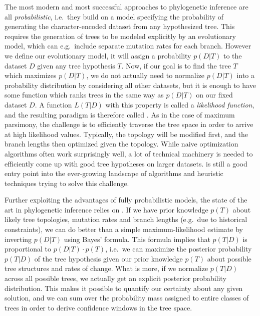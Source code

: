The most modern and most successful approaches to phylogenetic inference are all \textit{probabilistic}, i.e.\ they build on a model specifying the probability of generating the character-encoded dataset from any hypothesized tree. This requires the generation of trees to be modeled explicitly by an evolutionary model, which can e.g.\ include separate mutation rates for each branch. However we define our evolutionary model, it will assign a probability $p(D|T)$ to the dataset $D$ given any tree hypothesis $T$. Now, if our goal is to find the tree $T$ which maximizes $p(D|T)$, we do not actually need to normalize $p(D|T)$ into a probability distribution by considering all other datasets, but it is enough to have some function which ranks trees in the same way as $p(D|T)$ on our fixed dataset $D$. A function $L(T|D)$ with this property is called a \textit{likelihood function}, and the resulting paradigm is therefore called \textit{}. As in the case of maximum parsimony, the challenge is 
to efficiently traverse the tree space in order to arrive at high likelihood values. Typically, the topology will be modified first, and the branch lengths then optimized given the topology. While naive optimization algorithms often work surprisingly well, a lot of technical machinery is needed to efficiently come up with good tree hypotheses on larger datasets. \citet[Ch. 16]{felsenstein2004} is still a good entry point into the ever-growing landscape of algorithms and heuristic techniques trying to solve this challenge.

Further exploiting the advantages of fully probabilistic models, the state of the art in phylogenetic inference relies on . If we have prior knowledge $p(T)$ about likely tree topologies, mutation rates and branch lengths (e.g.\ due to historical constraints), we can do better than a simple maximum-likelihood estimate by inverting $p(D|T)$ using Bayes' formula. This formula implies that $p(T|D)$ is proportional to $p(D|T)\cdot p(T)$, i.e.\ we can maximize the posterior probability $p(T|D)$ of the tree hypothesis given our prior knowledge $p(T)$ about possible tree structures and rates of change. What is more, if we normalize $p(T|D)$ across all possible trees, we actually get an explicit posterior probability distribution. This makes it possible to quantify our certainty about any given solution, and we can sum over the probability mass assigned to entire classes of trees in order to derive confidence windows in the tree space.

